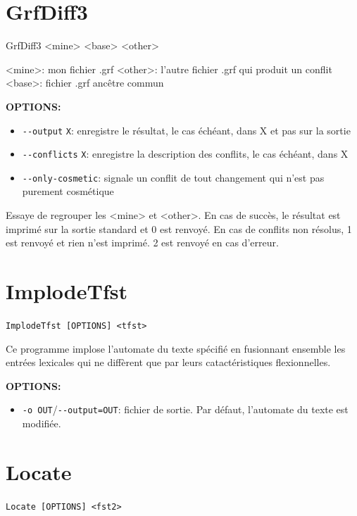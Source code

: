 \section{GrfDiff3}
GrfDiff3 <mine> <base> <other>

<mine>: mon fichier .grf
<other>: l'autre fichier .grf qui produit un conflit
<base>: fichier .grf ancêtre commun

\bigskip
\noindent \textbf{OPTIONS:}
\begin{itemize}
\item \verb+--output+ \verb+X+: enregistre le résultat, le cas échéant, dans X et pas sur la sortie
\item \verb+--conflicts+ \verb+X+: enregistre la description des conflits, le cas échéant, dans X
\item \verb+--only-cosmetic+: signale un conflit de tout changement qui n'est pas purement
	cosmétique
\end{itemize}

Essaye de regrouper les <mine> et <other>. En cas de succès, le résultat est imprimé sur la sortie
standard et 0 est renvoyé. En cas de conflits non résolus, 1 est renvoyé et rien n'est imprimé. 2
est renvoyé en cas d'erreur.



\section{ImplodeTfst}
 \verb+ImplodeTfst [OPTIONS] <tfst>+

\bigskip
\noindent Ce programme implose l'automate du texte spécifié en fusionnant ensemble les entrées lexicales qui ne diffèrent que par leurs catactéristiques flexionnelles.

\bigskip
\noindent \textbf{OPTIONS:}
\begin{itemize}
\item \verb+-o OUT+/\verb+--output=OUT+: fichier de sortie. Par défaut, l'automate du texte est modifiée.
\end{itemize}






\section{Locate}
\label{section-Locate}
\verb+Locate [OPTIONS] <fst2>+

